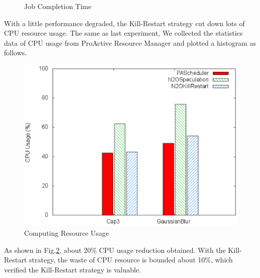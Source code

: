 \begin{figure}
\centering
{}
\caption{Job Completion Time}
\label{figure:abort_completiontime}
\end{figure}

With a little performance degraded, the Kill-Restart strategy cut down lots of CPU resource usage. The same as last experiment, We collected the statistics data of CPU usage from ProActive Resource Manager and plotted a histogram as follows.

\begin{figure}
\centering
\includegraphics[width=0.9\columnwidth]{figures/abort_resource_usage.eps}
\caption{Computing Resource Usage}
\label{figure:abort_resourceusage}
\end{figure}

As shown in Fig.\ref{figure:abort_resourceusage}, about 20\% CPU usage reduction obtained. With the Kill-Restart strategy, the waste of CPU resource is bounded about 10\%, which verified the Kill-Restart strategy is valuable.
